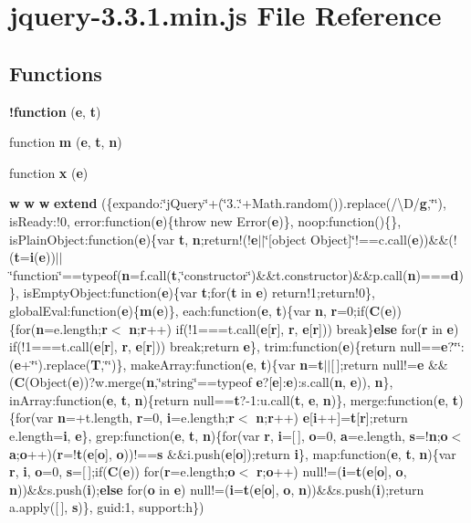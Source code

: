 \section{jquery-\/3.3.1.min.\+js File Reference}
\label{jquery-3_83_81_8min_8js}
\subsection*{Functions}
\begin{DoxyCompactItemize}
\item 
{\bf !function} ({\bf e}, {\bf t})
\item 
function {\bf m} ({\bf e}, {\bf t}, {\bf n})
\item 
function {\bf x} ({\bf e})
\item 
{\bf w} {\bf w} {\bf w} {\bf extend} (\{expando\+:\char`\"{}j\+Query\char`\"{}+(\char`\"{}3..\char`\"{}+Math.\+random()).replace(/\textbackslash{}D/{\bf g},\char`\"{}\char`\"{}), is\+Ready\+:!0, error\+:function({\bf e})\{throw new Error({\bf e})\}, noop\+:function()\{\}, is\+Plain\+Object\+:function({\bf e})\{var {\bf t}, {\bf n};return!(!{\bf e}$\vert$$\vert$\char`\"{}[object Object]\char`\"{}!==c.\+call({\bf e}))\&\&(!({\bf t}={\bf i}({\bf e}))$\vert$$\vert$\char`\"{}function\char`\"{}==typeof({\bf n}=f.\+call({\bf t},\char`\"{}constructor\char`\"{})\&\&t.\+constructor)\&\&p.\+call({\bf n})==={\bf d})\}, is\+Empty\+Object\+:function({\bf e})\{var {\bf t};for({\bf t} in {\bf e}) return!1;return!0\}, global\+Eval\+:function({\bf e})\{{\bf m}({\bf e})\}, each\+:function({\bf e}, {\bf t})\{var {\bf n}, {\bf r}=0;if({\bf C}({\bf e}))\{for({\bf n}=e.\+length;{\bf r}$<$ {\bf n};{\bf r}++) if(!1===t.\+call({\bf e}[{\bf r}], {\bf r}, {\bf e}[{\bf r}])) break\}{\bf else} for({\bf r} in {\bf e}) if(!1===t.\+call({\bf e}[{\bf r}], {\bf r}, {\bf e}[{\bf r}])) break;return {\bf e}\}, trim\+:function({\bf e})\{return null=={\bf e}?\char`\"{}\char`\"{}\+:({\bf e}+\char`\"{}\char`\"{}).replace({\bf T},\char`\"{}\char`\"{})\}, make\+Array\+:function({\bf e}, {\bf t})\{var {\bf n}={\bf t}$\vert$$\vert$[$\,$];return null!={\bf e} \&\&({\bf C}(Object({\bf e}))?w.\+merge({\bf n},\char`\"{}string\char`\"{}==typeof {\bf e}?[{\bf e}]\+:{\bf e})\+:s.\+call({\bf n}, {\bf e})), {\bf n}\}, in\+Array\+:function({\bf e}, {\bf t}, {\bf n})\{return null=={\bf t}?-\/1\+:u.\+call({\bf t}, {\bf e}, {\bf n})\}, merge\+:function({\bf e}, {\bf t})\{for(var {\bf n}=+t.\+length, {\bf r}=0, {\bf i}=e.\+length;{\bf r}$<$ {\bf n};{\bf r}++) {\bf e}[{\bf i}++]={\bf t}[{\bf r}];return e.\+length={\bf i}, {\bf e}\}, grep\+:function({\bf e}, {\bf t}, {\bf n})\{for(var {\bf r}, {\bf i}=[$\,$], {\bf o}=0, {\bf a}=e.\+length, {\bf s}=!{\bf n};{\bf o}$<$ {\bf a};{\bf o}++)({\bf r}=!{\bf t}({\bf e}[{\bf o}], {\bf o}))!=={\bf s} \&\&i.\+push({\bf e}[{\bf o}]);return {\bf i}\}, map\+:function({\bf e}, {\bf t}, {\bf n})\{var {\bf r}, {\bf i}, {\bf o}=0, {\bf s}=[$\,$];if({\bf C}({\bf e})) for({\bf r}=e.\+length;{\bf o}$<$ {\bf r};{\bf o}++) null!=({\bf i}={\bf t}({\bf e}[{\bf o}], {\bf o}, {\bf n}))\&\&s.\+push({\bf i});{\bf else} for({\bf o} in {\bf e}) null!=({\bf i}={\bf t}({\bf e}[{\bf o}], {\bf o}, {\bf n}))\&\&s.\+push({\bf i});return a.\+apply([$\,$], {\bf s})\}, guid\+:1, support\+:h\})
$$
\end{DoxyCompactItemize}
